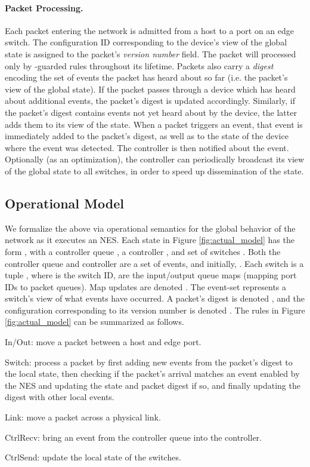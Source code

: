 \documentclass[pldi-cameraready]{sigplanconf}
\begin{document}
\paragraph{Packet Processing.}
Each packet entering the network is admitted from a host to a port
on an edge switch.  The configuration ID  corresponding to the device's
view of the global state is assigned to the packet's {\em version
  number} field. The packet will processed only by -guarded rules
throughout its lifetime.
Packets also carry a {\em digest} encoding the set of events the
packet has heard about so
far (i.e. the packet's view of the global state). If the packet passes
through a device which has heard about additional events, the packet's
digest is updated accordingly. Similarly, if the packet's digest
contains events not yet heard about by the device, the latter adds them to
its view of the state.
When a packet triggers an event, that event is immediately added to
the packet's digest, as well as to the state of the device where the
event was detected. The controller is then notified about the
event. Optionally (as an optimization), the controller
can periodically broadcast its view
of the global state to all switches, in order to speed up
dissemination of the state.


\subsection{Operational Model}
\label{subsec:model}

We formalize the above via operational semantics for the global
behavior of the network as it executes an NES.
Each state in Figure \ref{fig:actual_model} has the form ,
with a controller queue , a controller , and set of switches
.  Both the controller queue and controller are a set of events,
and initially, .
Each switch  is a tuple , where  is
the switch ID,  are the input/output queue maps
(mapping port IDs to packet queues).
Map updates are denoted .
The event-set  represents a switch's view of what events have
occurred.
A packet's digest is denoted , and the configuration
corresponding to its version number is denoted .
The rules in Figure \ref{fig:actual_model} can be summarized as follows.
\begin{compactitem}
\item {\sc In/Out}: move a packet between a host and edge port.
\item {\sc Switch}: process a packet by first adding new events from the
  packet's digest to the local state, then checking if the packet's
  arrival matches an event  enabled by the NES and updating the
  state and packet digest if so, and finally updating the digest with
  other local events.
\item {\sc Link}: move a packet across a physical link.
\item {\sc CtrlRecv}: bring an event from the controller
  queue into the controller.
\item {\sc CtrlSend}: update the local state of the switches.
\end{compactitem}
\end{document}

